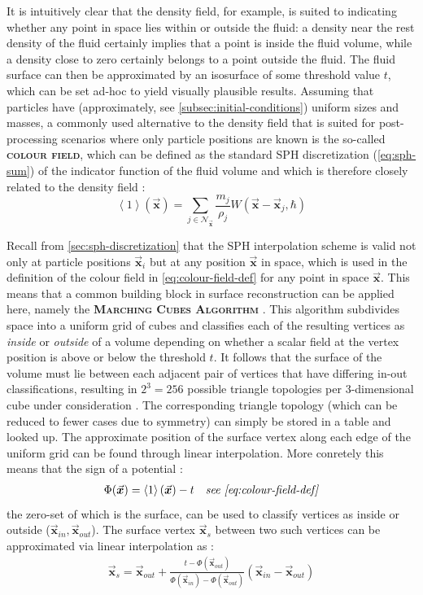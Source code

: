 \documentclass[oneside, a4paper]{book}
\newcommand\emphasis[1]{{\scshape\bfseries#1}}
\newcommand\angled[1]{\left\langle#1\right\rangle}
\newcommand\vek[1]{\vec{\bm{#1}}}
\newcommand\br[1]{\left(#1\right)}
\begin{document}
  It is intuitively clear that the density field, for example, is suited to indicating whether any point in space lies within or outside the fluid: a density near the rest density of the fluid certainly implies that a point is inside the fluid volume, while a density close to zero certainly belongs to a point outside the fluid. The fluid surface can then be approximated by an isosurface of some threshold value $t$, which can be set ad-hoc to yield visually plausible results. Assuming that particles have (approximately, see \autoref{subsec:initial-conditions}) uniform sizes and masses, a commonly used alternative to the density field that is suited for post-processing scenarios where only particle positions are known is the so-called \emphasis{colour field}, which can be defined as the standard SPH discretization (\autoref{eq:sph-sum}) of the indicator function of the fluid volume and which is therefore closely related to the density field \autocite{laplacian-surf-reconst}:
  \begin{equation}\label{eq:colour-field-def}
    \angled{1}\br{\vek{x}} = \sum_{j\in\mathcal{N}_{\vek{x}}} \frac{m_j}{\rho_j} W(\vek{x}-\vek{x}_j, \hbar)
  \end{equation}
  
  Recall from \autoref{sec:sph-discretization} that the SPH interpolation scheme is valid not only at particle positions $\vek{x}_i$ but at any position $\vek{x}$ in space, which is used in the definition of the colour field in \autoref{eq:colour-field-def} for any point in space $\vek{x}$. This means that a common building block in surface reconstruction can be applied here, namely the \emphasis{Marching Cubes Algorithm} \autocite{marching-cubes}. This algorithm subdivides space into a uniform grid of cubes and classifies each of the resulting vertices as \textit{inside} or \textit{outside} of a volume depending on whether a scalar field at the vertex position is above or below the threshold $t$. It follows that the surface of the volume must lie between each adjacent pair of vertices that have differing in-out classifications, resulting in $2^3=256$ possible triangle topologies per 3-dimensional cube under consideration \autocite{marching-cubes}. The corresponding triangle topology (which can be reduced to fewer cases due to symmetry) can simply be stored in a table and looked up. The approximate position of the surface vertex along each edge of the uniform grid can be found through linear interpolation. More conretely this means that the sign of a potential \autocite{laplacian-surf-reconst}:
  \begin{align}
    \Phi(\vek{x}) &= \angled{1}\br{\vek{x}} - t &\textit{see \autoref{eq:colour-field-def}}
  \end{align} 
  the zero-set of which is the surface, can be used to classify vertices as inside or outside ($\vek{x}_{in}, \vek{x}_{out}$). The surface vertex $\vek{x}_s$ between two such vertices can be approximated via linear interpolation as \autocite{laplacian-surf-reconst}:
  \begin{align}
    \vek{x}_s = \vek{x}_{out} + \frac{t-\Phi(\vek{x}_{out})}{\Phi(\vek{x}_{in})-\Phi(\vek{x}_{out})} \br{\vek{x}_{in}-\vek{x}_{out}}
  \end{align}
  
\end{document}
